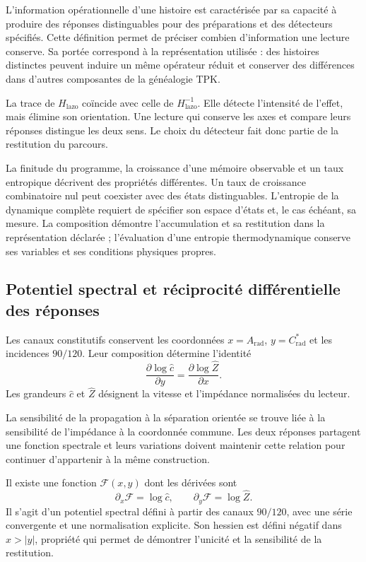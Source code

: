 L’information opérationnelle d’une histoire est caractérisée par
sa capacité à produire des réponses distinguables pour des préparations
et des détecteurs spécifiés. Cette définition permet de préciser combien
d’information une lecture conserve. Sa portée correspond à la représentation
utilisée : des histoires distinctes peuvent induire un même opérateur
réduit et conserver des différences dans d’autres composantes de la généalogie
TPK.

La trace de $H_{\mathrm{lazo}}$ coïncide avec celle de
$H_{\mathrm{lazo}}^{-1}$. Elle détecte l’intensité de l’effet, mais élimine
son orientation. Une lecture qui conserve les axes et compare leurs
réponses distingue les deux sens. Le choix du détecteur fait donc
partie de la restitution du parcours.

La finitude du programme, la croissance d’une mémoire observable et
un taux entropique décrivent des propriétés différentes. Un taux de
croissance combinatoire nul peut coexister avec des états distinguables.
L’entropie de la dynamique complète requiert de spécifier son espace
d’états et, le cas échéant, sa mesure. La composition démontre
l’accumulation et sa restitution dans la représentation déclarée ;
l’évaluation d’une entropie thermodynamique conserve ses variables
et ses conditions physiques propres.

\subsection{Potentiel spectral et réciprocité différentielle des réponses}
\label{subsec:narrativa-potencial-espectral}

Les canaux constitutifs conservent les coordonnées
$x=A_{\mathrm{rad}}$, $y=C^*_{\mathrm{rad}}$ et les incidences $90/120$.
Leur composition détermine l’identité
\begin{equation}
 \boxed{
 \frac{\partial\log\widehat c}{\partial y}
 =\frac{\partial\log\widehat Z}{\partial x}.}
 \label{eq:narrativa-reciprocidad-diferencial}
\end{equation}
Les grandeurs $\widehat c$ et $\widehat Z$ désignent la vitesse et
l’impédance normalisées du lecteur.

La sensibilité de la propagation à la séparation orientée se trouve
liée à la sensibilité de l’impédance à la coordonnée commune.
Les deux réponses partagent une fonction spectrale et leurs variations
doivent maintenir cette relation pour continuer d’appartenir à la même
construction.

Il existe une fonction $\mathscr F(x,y)$ dont les dérivées sont
\begin{equation}
 \partial_x\mathscr F=\log\widehat c,
 \qquad
 \partial_y\mathscr F=\log\widehat Z.
 \label{eq:narrativa-gradiente-potencial}
\end{equation}
Il s’agit d’un potentiel spectral défini à partir des canaux $90/120$,
avec une série convergente et une normalisation explicite. Son hessien est
défini négatif dans $x>|y|$, propriété qui permet de démontrer
l’unicité et la sensibilité de la restitution.

